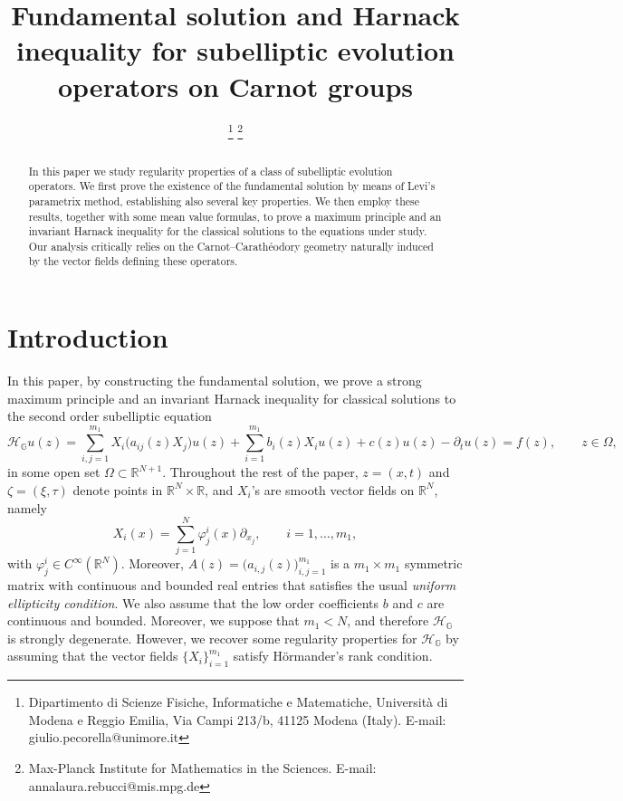 \documentclass[11pt,a4paper]{article}
\title{Fundamental solution and Harnack inequality for subelliptic evolution operators on Carnot groups}
\author{{\sc{G. Pecorella}
		\thanks{Dipartimento di Scienze Fisiche, Informatiche e Matematiche, Universit\`{a} di Modena e Reggio Emilia, Via
			Campi 213/b, 41125 Modena (Italy). E-mail: giulio.pecorella@unimore.it} \qquad 
		\sc{A. Rebucci}
		\thanks{Max-Planck Institute for Mathematics in the Sciences. E-mail: annalaura.rebucci@mis.mpg.de} 
}}
\numberwithin{equation}{section}
\newcommand{\R}{\mathbb{R}}
\def \rn {{\mathbb {R}}^{N}}
\def \rnn {{\mathbb {R}}^{N+1}}
\def \GG {{\mathbb{G}}}
\def \p {\partial}
\def \H {\mathscr{H}_\GG}
\def \t {{\tau}}
\def \x {{\xi}}
\def \z {{\zeta}}
\def \phi {{\varphi}}
\def \O {{\Omega}}
\begin{document}
\maketitle

\begin{abstract}
In this paper we study regularity properties of a class of subelliptic evolution operators. We first prove the existence of the fundamental solution by means of Levi’s parametrix method, establishing also several key properties. We then employ these results, together with some mean value formulas, to prove a maximum principle and an invariant Harnack inequality for the classical solutions to the equations under study. Our analysis critically relies on the Carnot–Carathéodory geometry naturally induced by the vector fields defining these operators.
\end{abstract}

\bigskip
\normalsize
\tableofcontents





\section{Introduction}
In this paper, by constructing the fundamental solution, we prove a strong maximum principle and an invariant Harnack inequality for classical solutions to the second order subelliptic equation
\begin{equation}\label{HG1}
	\H u(z) =\sum_{i,j=1}^{m_1} X_i\big(a_{ij}(z)X_j\big)u(z) + \sum_{i=1}^{m_1} b_i(z)X_iu(z)+ c(z)u(z)-\p_t u(z)=f(z),\qquad z\in\O,
\end{equation}
in some open set $\O\subset \rnn$. Throughout the rest of the paper, $z=(x,t)$ and $\z=(\x,\t)$ denote points in $\rn \times \R$, and $X_i$'s are smooth vector fields on $\rn$, namely
\begin{equation}\label{smooth-vector-field}
	X_i(x)=\sum_{j=1}^N \phi_j^i(x)\p_{x_j},\qquad i=1,\ldots,m_1,
\end{equation}
with $\phi_j^i\in C^\infty\left(\rn\right)$. Moreover, $A(z)=\big(a_{i,j}(z)\big)^{m_1}_{i,j=1}$ is a $m_1\times m_1$ symmetric matrix with continuous and bounded real entries that satisfies the usual \emph{uniform ellipticity condition}. We also assume that the low order coefficients $b$ and $c$ are continuous and bounded. Moreover, we suppose that $m_1<N$, and therefore $\H$ is strongly degenerate. However, we recover some regularity properties for $\H$ by assuming that the vector fields $\{X_i\}^{m_1}_{i=1}$  satisfy H\"ormander's rank condition. 
\end{document}
